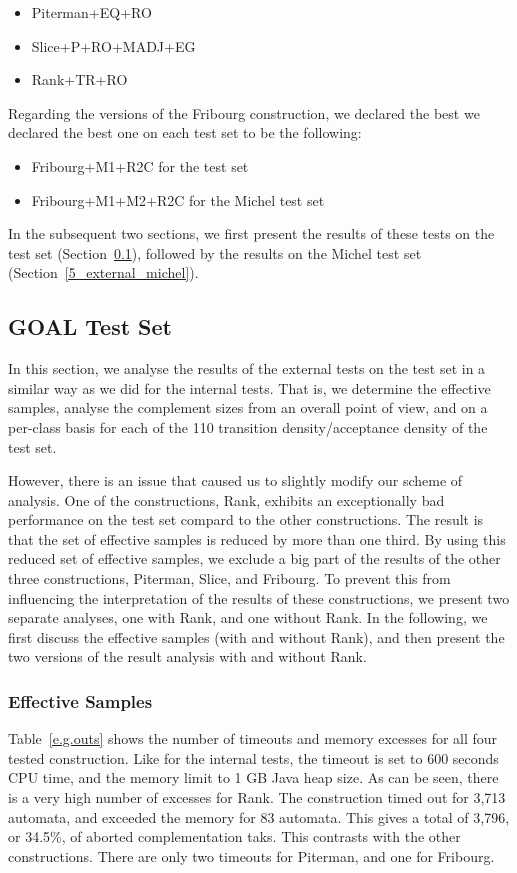 \begin{itemize}
\item Piterman+EQ+RO
\item Slice+P+RO+MADJ+EG
\item Rank+TR+RO
\end{itemize}

Regarding the versions of the Fribourg construction, we declared the best we declared the best one on each test set to be the following:

\begin{itemize}
\item Fribourg+M1+R2C    \tabto{4.2cm} for the \goal{} test set
\item Fribourg+M1+M2+R2C \tabto{4.2cm} for the Michel test set
\end{itemize}

In the subsequent two sections, we first present the results of these tests on the \goal{} test set (Section~\ref{5_external_goal}), followed by the results on the Michel test set (Section~\ref{5_external_michel}).


\subsection{GOAL Test Set}
\label{5_external_goal}
In this section, we analyse the results of the external tests on the \goal{} test set in a similar way as we did for the internal tests. That is, we determine the effective samples, analyse the complement sizes from an overall point of view, and on a per-class basis for each of the 110 transition density/acceptance density of the \goal{} test set.

However, there is an issue that caused us to slightly modify our scheme of analysis. One of the constructions, Rank, exhibits an exceptionally bad performance on the \goal{} test set compard to the other constructions. The result is that the set of effective samples is reduced by more than one third. By using this reduced set of effective samples, we exclude a big part of the results of the other three constructions, Piterman, Slice, and Fribourg. To prevent this from influencing the interpretation of the results of these constructions, we present two separate analyses, one with Rank, and one without Rank. In the following, we first discuss the effective samples (with and without Rank), and then present the two versions of the result analysis with and without Rank. 


\subsubsection{Effective Samples}
Table~\ref{e.g.outs} shows the number of timeouts and memory excesses for all four tested construction. Like for the internal tests, the timeout is set to 600 seconds CPU time, and the memory limit to 1 GB Java heap size. As can be seen, there is a very high number of excesses for Rank. The construction timed out for 3,713 automata, and exceeded the memory for 83 automata. This gives a total of 3,796, or 34.5\%, of aborted complementation taks. This contrasts with the other constructions. There are only two timeouts for Piterman, and one for Fribourg.

